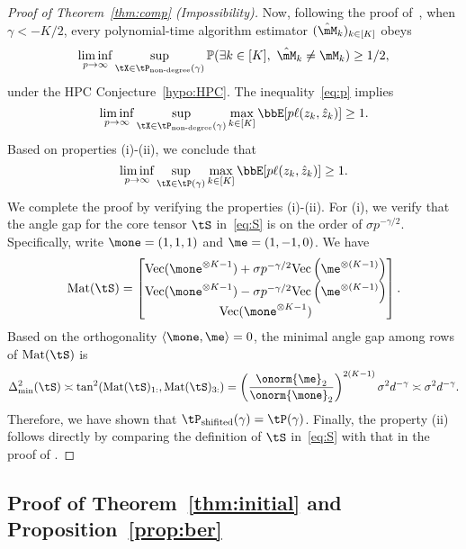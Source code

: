 \documentclass[lettersize,onecolumn,journal]{IEEEtran}
\theoremstyle{definition}
\theoremstyle{definition}
\newcommand{\Mat}{\text{Mat}}
\begin{document}
\begin{proof}[Proof of Theorem~\ref{thm:comp} (Impossibility)]
Now, following the proof of~\citet[Theorem 7]{han2020exact}, when $\gamma<-K/2$, every polynomial-time algorithm estimator $(\hat \mM_k)_{k\in[K]}$ obeys
\begin{align}\label{eq:p}
\liminf_{p\to \infty} \sup_{\tX\in \tP_{\text{non-degree}}(\gamma)}\mathbb{P}(\exists k \in[K],\  \hat \mM_k \neq \mM_k)\geq 1/2,
\end{align}
under the HPC Conjecture~\ref{hypo:HPC}.
The inequality~\eqref{eq:p} implies
\[
\liminf_{p\to \infty} \sup_{\tX\in \tP_{\text{non-degree}}(\gamma)}\max_{k\in[K]}\bbE[p\ell(z_k, \hat z_k)]\geq 1.
\]
Based on properties (i)-(ii), we conclude that
\[
\liminf_{p\to \infty} \sup_{\tX\in \tP(\gamma)}\max_{k\in[K]}\bbE[p\ell(z_k, \hat z_k)]\geq 1.
\]
We complete the proof by verifying the properties (i)-(ii). For (i), we verify that the angle gap for the core tensor $\tS$ in~\eqref{eq:S} is on the order of $\sigma p^{-\gamma/2}$. Specifically, write $\mone=(1,1,1)$ and $\me=(1,-1,0)$. We have
\[
\Mat(\tS)=
\begin{bmatrix}
\text{Vec}(\mone^{\otimes K-1})+\sigma p^{-\gamma/2}\text{Vec}\left(\me^{\otimes (K-1)}\right) \\
\text{Vec}(\mone^{\otimes K-1})-\sigma p^{-\gamma/2}\text{Vec}\left(\me^{\otimes (K-1)}\right) \\
\text{Vec}(\mone^{\otimes K-1})
\end{bmatrix}.
\]
Based on the orthogonality $\langle \mone, \me\rangle=0$, the minimal angle gap among rows of $\Mat(\tS)$ is
\begin{align}
\Delta^2_{\min}(\tS)\asymp \tan^2(\Mat(\tS)_{1:}, \Mat(\tS)_{3:})
=\left(\onorm{\me}_2 \over \onorm{\mone}_2\right)^{2(K-1)} \sigma^2 d^{-\gamma}\asymp \sigma^2 d^{-\gamma}.
\end{align}
Therefore, we have shown that $\tP_{\text{shifited}}(\gamma)=\tP(\gamma)$. Finally, the property (ii) follows directly by comparing the definition of $\tS$ in~\eqref{eq:S} with that in the proof of \citet[Theorem 7]{han2020exact}. 
\end{proof}

{
\color{blue}
\subsection{Proof of Theorem~\ref{thm:initial} and Proposition~\ref{prop:ber}} \label{sec:initial_prove}
}
\end{document}
